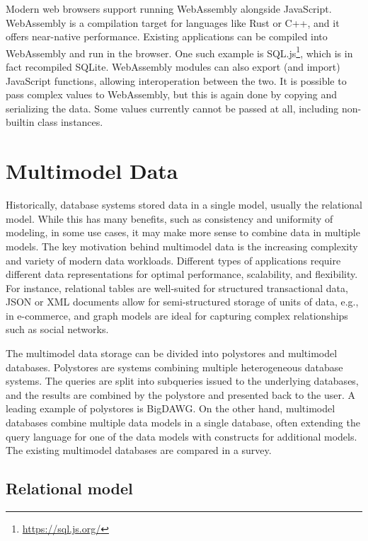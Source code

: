 Modern web browsers support running WebAssembly alongside JavaScript. WebAssembly is a compilation target for languages like Rust or C++, and it offers near-native performance. Existing applications can be compiled into WebAssembly and run in the browser. One such example is SQL.js\footnote{\url{https://sql.js.org/}}, which is in fact recompiled SQLite. WebAssembly modules can also export (and import) JavaScript functions, allowing interoperation between the two. It is possible to pass complex values to WebAssembly, but this is again done by copying and serializing the data. Some values currently cannot be passed at all, including non-builtin class instances.

\section{Multimodel Data}

Historically, database systems stored data in a single model, usually the relational model. While this has many benefits, such as consistency and uniformity of modeling, in some use cases, it may make more sense to combine data in multiple models. The key motivation behind multimodel data is the increasing complexity and variety of modern data workloads. Different types of applications require different data representations for optimal performance, scalability, and flexibility. For instance, relational tables are well-suited for structured transactional data, JSON or XML documents allow for semi-structured storage of units of data, e.g., in e-commerce, and graph models are ideal for capturing complex relationships such as social networks. 

The multimodel data storage can be divided into polystores and multimodel databases. Polystores are systems combining multiple heterogeneous database systems. The queries are split into subqueries issued to the underlying databases, and the results are combined by the polystore and presented back to the user. A leading example of polystores is BigDAWG\cite{duggan2015bigdawg}. On the other hand, multimodel databases combine multiple data models in a single database, often extending the query language for one of the data models with constructs for additional models. The existing multimodel databases are compared in a survey\cite{lu2019multi}.

\subsection{Relational model}


